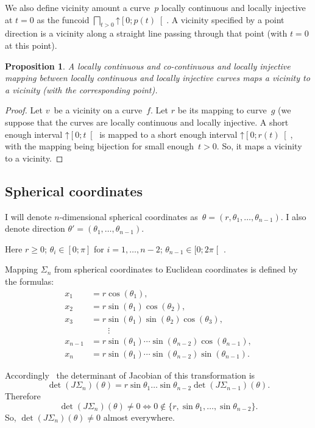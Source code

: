\documentclass[oneside,draft]{amsart}
\newtheorem{prop}{Proposition}
\begin{document}
We also define vicinity amount a curve~$p$ locally continuous and locally injective at $t=0$ as the funcoid $\bigsqcap_{t>0}\mathord{\uparrow}\left[0;p(t)\right[$. A vicinity specified by a point direction is a vicinity along a straight line passing through that point (with $t=0$ at this point).

\begin{prop}
A locally continuous and co-con\-ti\-nu\-o\-us and locally injective mapping between locally continuous and locally injective curves maps a vicinity to a vicinity (with the corresponding point).
\end{prop}

\begin{proof}
Let $v$~be a vicinity on a curve~$f$. Let $r$ be its mapping to curve~$g$ (we suppose that the curves are locally continuous and locally injective. A short enough interval $\mathord{\uparrow}\left[0;t\right[$ is mapped to a short enough interval $\mathord{\uparrow}\left[0;r(t)\right[$, with the mapping being bijection for small enough~$t>0$. So, it maps a vicinity to a vicinity.
\end{proof}

\subsection{Spherical coordinates}

I will denote $n$-dimensional spherical coordinates as~$\theta=(r, \theta_1,\dots,\theta_{n-1})$.
I also denote direction $\theta'=(\theta_1,\dots,\theta_{n-1})$.

Here $r\geq 0$; $\theta_i\in[0;\pi]$ for $i=1,\dots,n-2$; $\theta_{n-1}\in[0;2\pi\mathclose[$ .

Mapping $\Sigma_n$ from spherical coordinates to Euclidean coordinates is defined by the formulas:
\[
\begin{aligned}x_{1}&=r\cos(\theta _{1}),\\x_{2}&=r\sin(\theta _{1})\cos(\theta _{2}),\\x_{3}&=r\sin(\theta _{1})\sin(\theta _{2})\cos(\theta _{3}),\\&\qquad \vdots \\x_{n-1}&=r\sin(\theta _{1})\cdots \sin(\theta _{n-2})\cos(\theta _{n-1}),\\x_{n}&=r\sin(\theta _{1})\cdots \sin(\theta _{n-2})\sin(\theta _{n-1}).\end{aligned}
\]

Accordingly~\cite{polar-jacobian} the determinant of Jacobian of this transformation is
\[ \det (J\Sigma_n)(\theta) = r\sin\theta_1\dots\sin\theta_{n-2}\det (J\Sigma_{n-1})(\theta). \]
Therefore
\[
\det (J\Sigma_n)(\theta)\ne 0\Leftrightarrow 0\notin\{r,\sin\theta_1,\dots,\sin\theta_{n-2}\}.
\]
So, $\det (J\Sigma_n)(\theta)\ne 0$ almost everywhere.
\end{document}
